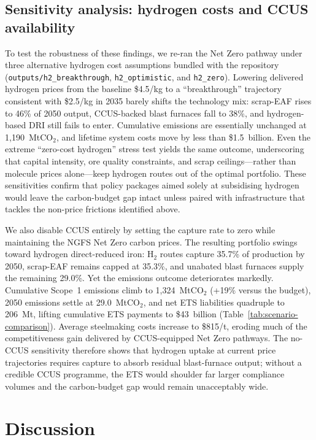 \documentclass[preprint,1p,authoryear]{elsarticle}
\begin{document}
\subsection{Sensitivity analysis: hydrogen costs and CCUS availability}

To test the robustness of these findings, we re-ran the Net Zero pathway under three alternative hydrogen cost assumptions bundled with the repository (\texttt{outputs/h2\_breakthrough}, \texttt{h2\_optimistic}, and \texttt{h2\_zero}). Lowering delivered hydrogen prices from the baseline \$4.5/kg to a ``breakthrough'' trajectory consistent with \$2.5/kg in 2035 barely shifts the technology mix: scrap-EAF rises to 46\% of 2050 output, CCUS-backed blast furnaces fall to 38\%, and hydrogen-based DRI still fails to enter. Cumulative emissions are essentially unchanged at 1{,}190~MtCO$_2$, and lifetime system costs move by less than \$1.5~billion. Even the extreme ``zero-cost hydrogen'' stress test yields the same outcome, underscoring that capital intensity, ore quality constraints, and scrap ceilings---rather than molecule prices alone---keep hydrogen routes out of the optimal portfolio. These sensitivities confirm that policy packages aimed solely at subsidising hydrogen would leave the carbon-budget gap intact unless paired with infrastructure that tackles the non-price frictions identified above.

We also disable CCUS entirely by setting the capture rate to zero while maintaining the NGFS Net Zero carbon prices. The resulting portfolio swings toward hydrogen direct-reduced iron: H$_2$ routes capture 35.7\% of production by 2050, scrap-EAF remains capped at 35.3\%, and unabated blast furnaces supply the remaining 29.0\%. Yet the emissions outcome deteriorates markedly. Cumulative Scope~1 emissions climb to 1{,}324~MtCO$_2$ (+19\% versus the budget), 2050 emissions settle at 29.0~MtCO$_2$, and net ETS liabilities quadruple to 206~Mt, lifting cumulative ETS payments to \$43~billion (Table~\ref{tab:scenario-comparison}). Average steelmaking costs increase to \$815/t, eroding much of the competitiveness gain delivered by CCUS-equipped Net Zero pathways. The no-CCUS sensitivity therefore shows that hydrogen uptake at current price trajectories requires capture to absorb residual blast-furnace output; without a credible CCUS programme, the ETS would shoulder far larger compliance volumes and the carbon-budget gap would remain unacceptably wide.

\section{Discussion}
\end{document}
